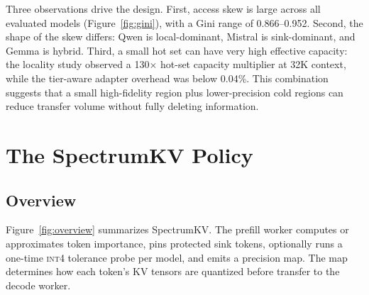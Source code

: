 \documentclass[11pt]{article}
\newcommand{\method}{SpectrumKV}
\newcommand{\pct}{\%}
\newcommand{\intiv}{\textsc{int4}}
\theoremstyle{plain}
\theoremstyle{definition}
\begin{document}
Three observations drive the design.  First, access skew is large across all evaluated models (Figure~\ref{fig:gini}), with a Gini range of 0.866--0.952.  Second, the shape of the skew differs: Qwen is local-dominant, Mistral is sink-dominant, and Gemma is hybrid.  Third, a small hot set can have very high effective capacity: the locality study observed a 130$\times$ hot-set capacity multiplier at 32K context, while the tier-aware adapter overhead was below 0.04\pct{}.  This combination suggests that a small high-fidelity region plus lower-precision cold regions can reduce transfer volume without fully deleting information.

\section{The \method{} Policy}
\label{sec:method}

\subsection{Overview}
Figure~\ref{fig:overview} summarizes \method{}.  The prefill worker computes or approximates token importance, pins protected sink tokens, optionally runs a one-time \intiv{} tolerance probe per model, and emits a precision map.  The map determines how each token's KV tensors are quantized before transfer to the decode worker.
\end{document}
